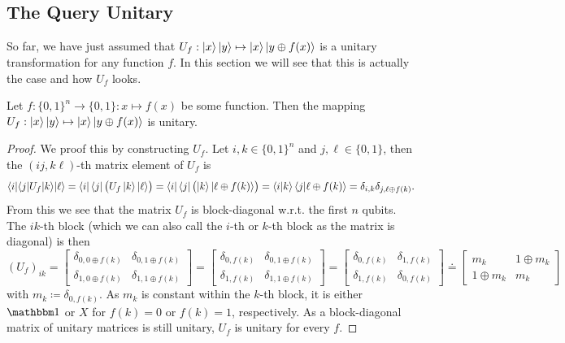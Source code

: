 		\subsection{The Query Unitary}
			\label{subsec:queryUnitary}

			So far, we have just assumed that \( U_f : \ket{x}\ket{y} \mapsto \ket{x}\ket{y \oplus f(x)} \) is a unitary transformation for any function \(f\). In this section we will see that this is actually the case and how \(U_f\) looks.

			\begin{theorem}
				Let \( f : \{ 0, 1 \}^n \to \{ 0, 1 \} : x \mapsto f(x) \) be some function. Then the mapping \( U_f : \ket{x}\ket{y} \mapsto \ket{x}\ket{y \oplus f(x)} \) is unitary.
			\end{theorem}
			\begin{proof}
				We proof this by constructing \(U_f\). Let \( i, k \in \{ 0, 1 \}^n \) and \( j, \ell \in \{ 0, 1 \} \), then the \( (ij, k\ell) \)-th matrix element of \(U_f\) is
				\begin{equation}
					\bra{i}\!\!\mel{j}{U_f}{k}\!\ket{\ell}
						= \bra{i} \bra{j} \bigl( U_f \ket{k} \ket{\ell} \bigr)
						= \bra{i} \bra{j} \bigl( \ket{k} \ket{\ell \oplus f(k)} \bigr)
						= \braket{i}{k} \braket{j}{\ell \oplus f(k)}
						= \delta_{i, k} \delta_{j, \ell \oplus f(k)}.
				\end{equation}
				From this we see that the matrix \(U_f\) is block-diagonal w.r.t. the first \(n\) qubits. The \(ik\)-th block (which we can also call the \(i\)-th or \(k\)-th block as the matrix is diagonal) is then
				\begin{equation}
					(U_f)_{ik}
					=
					\begin{bmatrix}
						\delta_{0, 0 \oplus f(k)} & \delta_{0, 1 \oplus f(k)} \\
						\delta_{1, 0 \oplus f(k)} & \delta_{1, 1 \oplus f(k)}
					\end{bmatrix}
					=
					\begin{bmatrix}
						\delta_{0, f(k)} & \delta_{0, 1 \oplus f(k)} \\
						\delta_{1, f(k)} & \delta_{1, 1 \oplus f(k)}
					\end{bmatrix}
					=
					\begin{bmatrix}
						\delta_{0, f(k)} & \delta_{1, f(k)} \\
						\delta_{1, f(k)} & \delta_{0, f(k)}
					\end{bmatrix}
					\doteq
					\begin{bmatrix}
						m_k & 1 \oplus m_k \\
						1 \oplus m_k & m_k
					\end{bmatrix}
				\end{equation}
				with \( m_k \coloneqq \delta_{0, f(k)} \). As \(m_k\) is constant within the \(k\)-th block, it is either \(\ID\) or \(X\) for \(f(k) = 0\) or \(f(k) = 1\), respectively. As a block-diagonal matrix of unitary matrices is still unitary, \(U_f\) is unitary for every \(f\).
			\end{proof}

